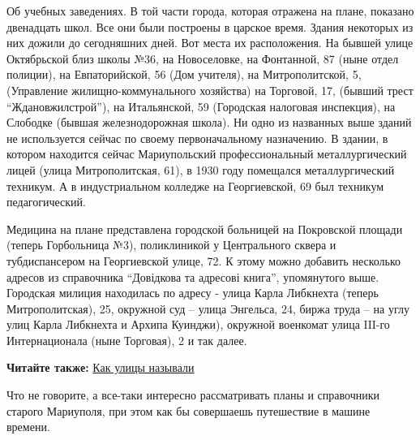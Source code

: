 Об учебных заведениях. В той части города, которая отражена на плане, показано
двенадцать школ. Все они были построены в царское время. Здания некоторых из
них дожили до сегодняшних дней. Вот места их расположения. На бывшей улице
Октябрьской близ школы №36, на Новоселовке, на Фонтанной, 87 (ныне отдел
полиции), на Евпаторийской, 56 (Дом учителя), на Митрополитской, 5, (Управление
жилищно-коммунального хозяйства) на Торговой, 17, (бывший трест
\enquote{Ждановжилстрой}), на Итальянской, 59 (Городская налоговая инспекция), на
Слободке (бывшая железнодорожная школа). Ни одно из названных выше зданий не
используется сейчас по своему первоначальному назначению. В здании, в котором
находится сейчас Мариупольский профессиональный металлургический лицей (улица
Митрополитская, 61), в 1930 году помещался металлургический техникум. А в
индустриальном колледже на Георгиевской, 69 был техникум педагогический. 

Медицина на плане представлена городской больницей на Покровской площади
(теперь Горбольница №3), поликлиникой у Центрального сквера и тубдиспансером на
Георгиевской улице, 72. К этому можно добавить несколько адресов из справочника
\enquote{Довідкова та адресові книга}, упомянутого выше. Городская милиция находилась
по адресу - улица Карла Либкнехта (теперь Митрополитская), 25, окружной суд –
улица Энгельса, 24, биржа труда – на углу улиц Карла Либкнехта и Архипа
Куинджи), окружной военкомат улица ΙΙΙ-го Интернационала (ныне Торговая), 2 и
так далее.

\textbf{Читайте также:} \href{https://mrpl.city/blogs/view/kak-ulitsy-nazyvali}{Как улицы называли}

Что не говорите, а все-таки интересно рассматривать планы и справочники старого
Мариуполя, при этом как бы совершаешь путешествие в машине времени.
